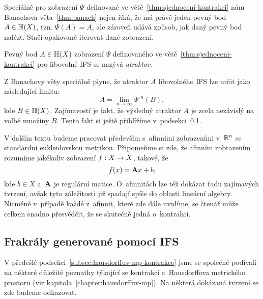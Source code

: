 Speciálně pro zobrazení $\Psi$ definované ve větě~\ref{thm:sjednoceni-kontrakci} nám Banachova věta~\ref{thm:banach} nejen říká, že má právě jeden pevný bod $A\in\mathbb{H}(X)$, tzn. $\Psi(A)=A$, ale zároveň udává způsob, jak daný pevný bod nalézt. Stačí opakovaně iterovat dané zobrazení.
\begin{definition}[Atraktor]\label{def:atraktor}
    Pevný bod $A\in\mathbb{H}(X)$ zobrazení $\Psi$ definovaného ve větě~\ref{thm:sjednoceni-kontrakci} pro libovolné IFS se nazývá \emph{atraktor}.
\end{definition}
Z Banachovy věty speciálně plyne, že atraktor $A$ libovolného IFS lze určit jako následující limitu:
\[A=\lim_{n\to\infty}\Psi^{\circ n}(B),\]
kde $B\in\mathbb{H}(X)$. Zajímavostí je fakt, že výsledný atraktor $A$ je zcela nezávislý na volbě množiny $B$. Tento fakt si ještě přiblížíme v~podsekci~\ref{subsec:fraktaly-ifs}.

V dalším textu budeme pracovat především s~afinními zobrazeními v~$\mathbb{R}^n$ se standardní eukleidovskou metrikou. Připomeňme si zde, že afinním zobrazením rozumíme jakékoliv zobrazení $f:X \rightarrow X$, takové, že
\[f(x)=\mathbf{A}x+b,\]
kde $b\in X$ a~$\mathbf{A}$ je regulární matice. O~afinnitách lze též dokázat řadu zajímavých tvrzení, avšak tyto záležitosti již spadají spíše do oblasti lineární algebry. Nicméně v~případě každé z~afinnit, které zde dále uvidíme, se čtenář může celkem snadno přesvědčit, že se skutečně jedná o~kontrakci.

\subsection{Frakrály generované pomocí IFS}\label{subsec:fraktaly-ifs}

V předešlé podsekci~\ref{subsec:hausdorffuv-mp-kontrakce} jsme se společně podívali na některé důležité poznatky týkající se kontrakcí a~Hausdorffova metrického prostoru (viz kapitola~\ref{chapter:hausdorffuv-mp}). Na některá dokázaná tvrzení se zde budeme odkazovat.

